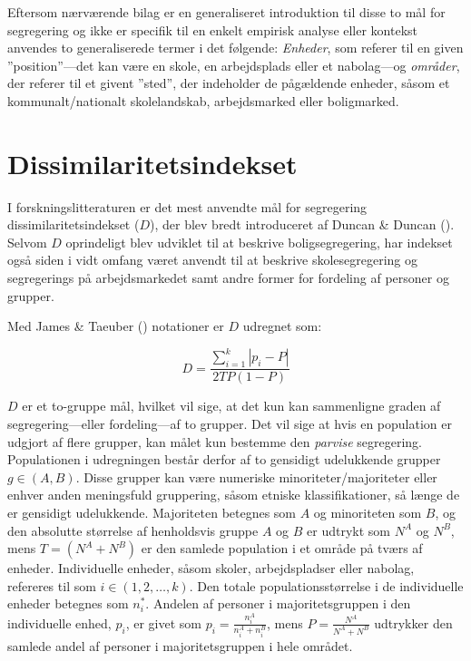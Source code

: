 \documentclass[
]{book}
\begin{document}
Eftersom nærværende bilag er en generaliseret introduktion til disse to mål for segregering og ikke er specifik til en enkelt empirisk analyse eller kontekst anvendes to generaliserede termer i det følgende: \emph{Enheder}, som referer til en given ''position''---det kan være en skole, en arbejdsplads eller et nabolag---og \emph{områder}, der referer til et givent ''sted'', der indeholder de pågældende enheder, såsom et kommunalt/nationalt skolelandskab, arbejdsmarked eller boligmarked.

\section{Dissimilaritetsindekset}\label{dissimkap}

I forskningslitteraturen er det mest anvendte mål for segregering dissimilaritetsindekset (\(D\)), der blev bredt introduceret af Duncan \& Duncan (). Selvom \(D\) oprindeligt blev udviklet til at beskrive boligsegregering, har indekset også siden i vidt omfang været anvendt til at beskrive skolesegregering og segregerings på arbejdsmarkedet samt andre former for fordeling af personer og grupper.

Med James \& Taeuber () notationer er \(D\) udregnet som:

\begin{equation}
\label{eq:dissim}
D=\frac{ {\textstyle \sum_{i=1}^{k} \left | p_{i} - P \right | } }{ 2TP \left ( 1-P \right ) }
\end{equation}

\(D\) er et to-gruppe mål, hvilket vil sige, at det kun kan sammenligne graden af segregering---eller fordeling---af to grupper. Det vil sige at hvis en population er udgjort af flere grupper, kan målet kun bestemme den \emph{parvise} segregering. Populationen i udregningen består derfor af to gensidigt udelukkende grupper \(g \in (A, B)\). Disse grupper kan være numeriske minoriteter/majoriteter eller enhver anden meningsfuld gruppering, såsom etniske klassifikationer, så længe de er gensidigt udelukkende. Majoriteten betegnes som \(A\) og minoriteten som \(B\), og den absolutte størrelse af henholdsvis gruppe \(A\) og \(B\) er udtrykt som \(N^{A}\) og \(N^{B}\), mens \(T=\left( N^{A} + N^{B} \right)\) er den samlede population i et område på tværs af enheder. Individuelle enheder, såsom skoler, arbejdspladser eller nabolag, refereres til som \(i \in (1, 2, \dots, k)\). Den totale populationsstørrelse i de individuelle enheder betegnes som \(n_{i}^{*}\). Andelen af personer i majoritetsgruppen i den individuelle enhed, \(p_{i}\), er givet som \(p_{i} = \frac{n_{i}^{A}}{n_{i}^{A} + n_{i}^{B}}\), mens \(P = \frac{N^{A}}{N^{A} + N^{B}}\) udtrykker den samlede andel af personer i majoritetsgruppen i hele området.
\end{document}
